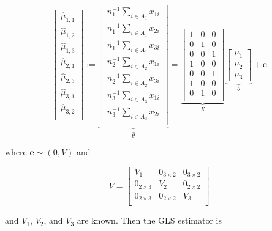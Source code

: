 \documentclass[12pt]{article}
\renewcommand{\bf}[1]{\mathbf{#1}}
\begin{document}
\[
\begin{bmatrix}
  \hat \mu_{1,1} \\
  \hat \mu_{1,2} \\
  \hat \mu_{1,3} \\
  \hat \mu_{2,1} \\
  \hat \mu_{2,3} \\
  \hat \mu_{3,1} \\
  \hat \mu_{3,2} \\
\end{bmatrix} :=
\underbrace{\begin{bmatrix}
  n_1^{-1} \sum_{i \in A_1} x_{1i} \\
  n_1^{-1} \sum_{i \in A_1} x_{2i} \\
  n_1^{-1} \sum_{i \in A_1} x_{3i} \\
  n_2^{-1} \sum_{i \in A_2} x_{1i} \\
  n_2^{-1} \sum_{i \in A_2} x_{3i} \\
  n_3^{-1} \sum_{i \in A_3} x_{1i} \\
  n_3^{-1} \sum_{i \in A_3} x_{2i} \\
\end{bmatrix}}_{\hat{\theta}} =
\underbrace{\begin{bmatrix}
  1 & 0 & 0 \\
  0 & 1 & 0 \\
  0 & 0 & 1 \\
  1 & 0 & 0 \\
  0 & 0 & 1 \\
  1 & 0 & 0 \\
  0 & 1 & 0 \\
\end{bmatrix}}_{X}
\underbrace{
\begin{bmatrix}
  \mu_1 \\ \mu_2 \\ \mu_3
\end{bmatrix}}_{\theta} + 
\bf e
\]

where $\bf e  \sim (0, V)$ and 

\[V = 
  \begin{bmatrix}
    V_1 & 0_{3 \times 2} & 0_{3 \times 2} \\
    0_{2 \times 3} & V_2 & 0_{2 \times 2} \\
    0_{2 \times 3} & 0_{2 \times 2} & V_3 \\
  \end{bmatrix}
\]

and $V_1$, $V_2$, and $V_3$ are known. Then the GLS estimator is
\end{document}
